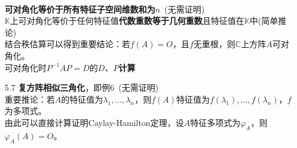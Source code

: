 \documentclass[a4paper,UTF8,fontset=windows,AutoFakeBold]{ctexart}
\newcommand*{\note}{\noindent *}
\begin{document}
\begin{enumerate}
    \\\textbf{可对角化等价于所有特征子空间维数和为}$n$\ (无需证明)
    \\$\mathbb{K}$上可对角化等价于任何特征值\textbf{代数重数等于几何重数}且特征值在$\mathbb{K}$中(简单推论)
    \\\note 结合秩估算可以得到重要结论：若$f(A)=O$，且$f$无重根，则$\mathbb{C}$上方阵$A$可对角化。
    \\可对角化时$P^{-1}AP=D$的$D$、$P$\textbf{计算}
    \item[5.7] \textbf{复方阵相似三角化}，即例6\ (无需证明)
    \\\note 重要推论：若$A$的特征值为$\lambda_1,\dots,\lambda_n$，则$f(A)$特征值为$f(\lambda_1),\dots,f(\lambda_n)$，$f$为多项式。
    \\\note 由此可以直接计算证明Caylay-Hamilton定理，设$A$特征多项式为$\varphi_A$，则$\varphi_A(A)=O$。
\end{enumerate}
\end{document}
